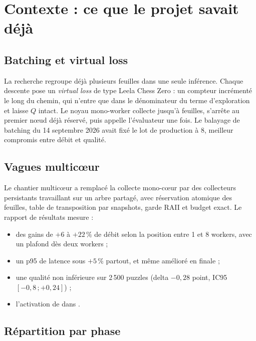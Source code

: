 \section{Contexte : ce que le projet savait d\'ej\`a}

\subsection{Batching et virtual loss}

La recherche regroupe d\'ej\`a plusieurs feuilles dans une seule inf\'erence.
Chaque descente pose un \emph{virtual loss} de type Leela Chess Zero : un
compteur  incr\'ement\'e le long du chemin, qui n'entre que
dans le d\'enominateur du terme d'exploration et laisse $Q$ intact. Le noyau
mono-worker collecte jusqu'\`a  feuilles, s'arr\^ete au
premier n\oe{}ud d\'ej\`a r\'eserv\'e, puis appelle l'\'evaluateur une fois. Le
balayage de batching du 14 septembre 2026 avait fix\'e le lot de production
\`a 8, meilleur compromis entre d\'ebit et qualit\'e.

\subsection{Vagues multic\oe{}ur}

Le chantier multic\oe{}ur a remplac\'e la collecte mono-c\oe{}ur par des
collecteurs persistants travaillant sur un arbre partag\'e, avec r\'eservation
atomique des feuilles, table de transposition par snapshots, garde RAII et
budget exact. Le rapport de r\'esultats 
mesure :

\begin{itemize}[leftmargin=1.2em,itemsep=2pt]
  \item des gains de $+6$ \`a $+22\,\%$ de d\'ebit selon la position entre 1 et
  8 workers, avec un plafond d\`es deux workers ;
  \item un p95 de latence sous $+5\,\%$ partout, et m\^eme am\'elior\'e en
  finale ;
  \item une qualit\'e non inf\'erieure sur 2\,500 puzzles (delta $-0,28$ point,
  IC95 $[-0,8\,;+0,24]$) ;
  \item l'activation de  dans .
\end{itemize}

\subsection{R\'epartition par phase}

